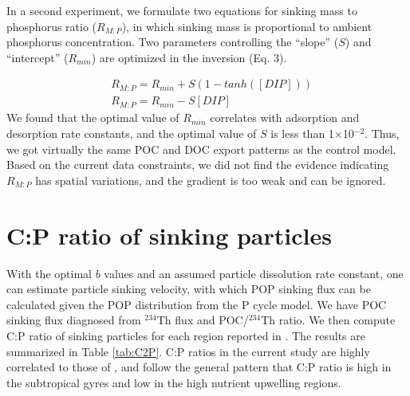 In a second experiment, we formulate two equations for sinking mass to phosphorus ratio ($R_{M:P}$), in which sinking mass is proportional to ambient phosphorus concentration.
Two parameters controlling the ``slope'' ($S$) and ``intercept'' ($R_{min}$) are optimized in the inversion (Eq. 3).

\begin{equation}
\begin{split}
  &R_{M:P} = R_{min}+S(1-tanh([DIP]))\\
  &R_{M:P} = R_{min}-S[DIP]
\end{split}
\end{equation}
We found that the optimal value of $R_{min}$ correlates with adsorption and desorption rate constants, and the optimal value of $S$ is less than 1$\times$10$^{-2}$. Thus, we got virtually the same POC and DOC export patterns as the control model. Based on the current data constraints, we did not find the evidence indicating $R_{M:P}$ has spatial variations, and the gradient is too weak and can be ignored.

\section{C:P ratio of sinking particles}
With the optimal $b$ values and an assumed particle dissolution rate constant, one can estimate particle sinking velocity\citep{kriest2008}, with which POP sinking flux can be calculated given the POP distribution from the P cycle model.
We have POC sinking flux diagnosed from $^{234}$Th flux and POC/$^{234}$Th ratio.
We then compute C:P ratio of sinking particles for each region reported in \cite{Teng2014}.
The results are summarized in Table \ref{tab:C2P}.
C:P ratios in the current study are highly correlated to those of \cite{Teng2014}, and follow the general pattern that C:P ratio is high in the subtropical gyres and low in the high nutrient upwelling regions.


